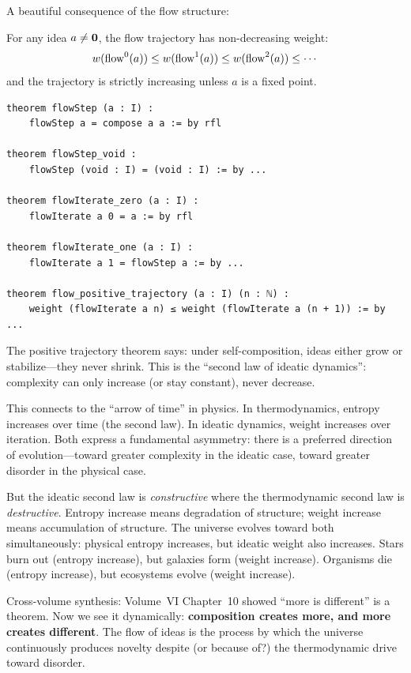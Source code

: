 A beautiful consequence of the flow structure:

\begin{theorem}
\label{thm:positive-trajectory}
For any idea $a \neq \mathbf{0}$, the flow trajectory has non-decreasing weight:
\[
  w(\text{flow}^0(a)) \leq w(\text{flow}^1(a)) \leq w(\text{flow}^2(a)) \leq \cdots
\]
and the trajectory is strictly increasing unless $a$ is a fixed point.
\end{theorem}

\begin{lstlisting}[caption={Flow trajectory (IDT\_v3\_Emergence.lean)}]
theorem flowStep (a : I) :
    flowStep a = compose a a := by rfl

theorem flowStep_void :
    flowStep (void : I) = (void : I) := by ...

theorem flowIterate_zero (a : I) :
    flowIterate a 0 = a := by rfl

theorem flowIterate_one (a : I) :
    flowIterate a 1 = flowStep a := by ...

theorem flow_positive_trajectory (a : I) (n : ℕ) :
    weight (flowIterate a n) ≤ weight (flowIterate a (n + 1)) := by ...
\end{lstlisting}

\begin{interpretation}
The positive trajectory theorem says: under self-composition, ideas either grow
or stabilize---they never shrink. This is the ``second law of ideatic dynamics'':
complexity can only increase (or stay constant), never decrease.

This connects to the ``arrow of time'' in physics. In thermodynamics, entropy
increases over time (the second law). In ideatic dynamics, weight increases
over iteration. Both express a fundamental asymmetry: there is a preferred
direction of evolution---toward greater complexity in the ideatic case, toward
greater disorder in the physical case.

But the ideatic second law is \emph{constructive} where the thermodynamic
second law is \emph{destructive}. Entropy increase means degradation of
structure; weight increase means accumulation of structure. The universe
evolves toward both simultaneously: physical entropy increases, but ideatic
weight also increases. Stars burn out (entropy increase), but galaxies form
(weight increase). Organisms die (entropy increase), but ecosystems evolve
(weight increase).

Cross-volume synthesis: Volume~VI Chapter~10 showed ``more is different'' is
a theorem. Now we see it dynamically: \textbf{composition creates more, and
more creates different}. The flow of ideas is the process by which the universe
continuously produces novelty despite (or because of?) the thermodynamic drive
toward disorder.
\end{interpretation}

